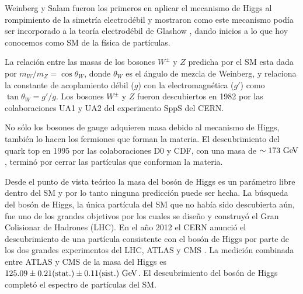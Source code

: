 Weinberg y Salam fueron los primeros en aplicar el mecanismo de Higgs al
rompimiento de la simetría electrodébil
\cite{PhysRevLett.19.1264,PhysRev.127.965} y mostraron como este mecanismo podía
ser incorporado a la teoría electrodébil de Glashow \cite{Glashow1961579}, dando
inicios a lo que hoy conocemos como SM de la física de partículas.

La relación entre las masas de los bosones $W^\pm$ y $Z$ predicha por el SM esta
dada por $m_W/m_Z = \cos \theta_W$, donde $\theta_W$ es el ángulo de
mezcla de Weinberg, y relaciona la constante de acoplamiento débil ($g$) con la
electromagnética ($g'$) como $\tan\theta_W = g'/g$. Los bosones $W^\pm$ y $Z$
fueron descubiertos en 1982 por las colaboraciones UA1 y UA2 del experimento
SppS del CERN.

No sólo los bosones de gauge adquieren masa debido al mecanismo de Higgs,
también lo hacen los fermiones que forman la materia. El descubrimiento del
quark top en 1995 por las colaboraciones D0 y CDF, con una masa de $\sim 173
\GeV$, terminó por cerrar las partículas que conforman la materia.

Desde el punto de vista teórico la masa del bosón de Higgs es un parámetro libre
dentro del SM y por lo tanto ninguna predicción puede ser hecha. La búsqueda
del bosón de Higgs, la única partícula del SM que no había sido descubierta
aún, fue uno de los grandes objetivos por los cuales se dise\~no y construyó el
Gran Colisionar de Hadrones (LHC). En el a\~no 2012 el CERN anunció el
descubrimiento de una partícula consistente con el bosón de Higgs por parte de
los dos grandes experimentos del LHC, ATLAS y CMS
\cite{Aad:2012tfa,Chatrchyan:2012ufa}. La medición combinada entre ATLAS y CMS
de la masa del Higgs es $125.09 \pm 0.21 \text{(stat.)} \pm 0.11 \text{(sist.)}
\gev$. El descubrimiento del bosón de Higgs completó el espectro de partículas del SM.

